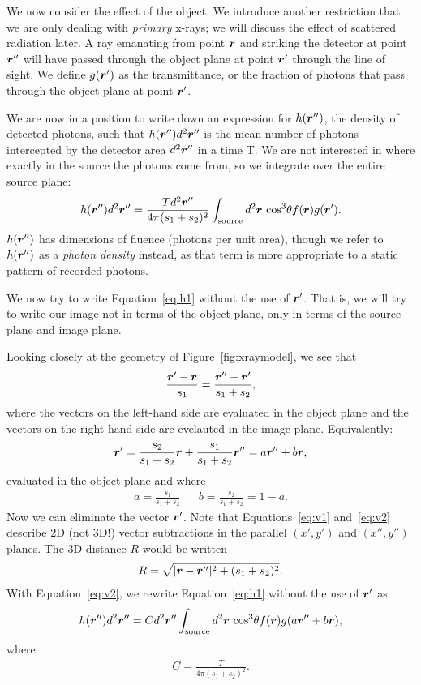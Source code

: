 \documentclass[mphy386-notes.tex]{subfiles}
\begin{document}
We now consider the effect of the object. We introduce another restriction
that we are only dealing with \textit{primary} x-rays; we will discuss the
effect of scattered radiation later. A ray emanating from point $\boldsymbol{r}$ and
striking the detector at point $\boldsymbol{r}''$ will have passed through the object
plane at point $\boldsymbol{r}'$ through the line of sight. We define $g(\boldsymbol{r}')$ as the transmittance, or the
fraction of photons that pass through the object plane at point $\boldsymbol{r}'$.

We are now in a position to write down an expression for $h(\boldsymbol{r}'')$, the
density of detected photons, such that $h(\boldsymbol{r}'')d^2\boldsymbol{r}''$ is the mean
number of photons intercepted by the detector area $d^2\boldsymbol{r}''$ in a time T.
We are not interested in where exactly in the source the photons come from,
so we integrate over the entire source plane:
\begin{align}
  h(\boldsymbol{r}'')d^2\boldsymbol{r}'' = \frac{Td^2\boldsymbol{r}''}{4\pi(s_1 + s_2)^2}\int_{\text{source}}d^2\boldsymbol{r} \text{ cos}^3\theta f(\boldsymbol{r})g(\boldsymbol{r}').
  \label{eq:h1}
\end{align}
$h(\boldsymbol{r}'')$ has dimensions of fluence (photons per unit area), though
we refer to $h(\boldsymbol{r}'')$ as a \textit{photon density} instead, as that
term is more appropriate to a static pattern of recorded photons.

We now try to write Equation~\ref{eq:h1} without the use of $\boldsymbol{r}'$.  That is,
we will try to write our image not in terms of the object plane,  only in terms
of the source plane and image plane.

Looking closely at the geometry of Figure~\ref{fig:xraymodel}, we
see that
\begin{align}
  \frac{\boldsymbol{r}'-\boldsymbol{r}}{s_1} = \frac{\boldsymbol{r}''-\boldsymbol{r}'}{s_1+s_2},
  \label{eq:v1}
\end{align}
where the vectors on the left-hand side are evaluated in the object plane
and the vectors on the right-hand side are evelauted in the image plane.
Equivalently:
\begin{align}
  \boldsymbol{r}' = \frac{s_2}{s_1 + s_2}\boldsymbol{r} + \frac{s_1}{s_1+s_2}\boldsymbol{r}'' = a\boldsymbol{r}'' + b\boldsymbol{r},
  \label{eq:v2}
\end{align}
evaluated in the object plane and where
\begin{align}
  a = \frac{s_1}{s_1+s_2} & & b = \frac{s_2}{s_1 + s_2} = 1 - a.
\end{align}
Now we can eliminate the vector $\boldsymbol{r}'$. Note that Equations~\ref{eq:v1}
and~\ref{eq:v2} describe 2D (not 3D!) vector subtractions in the parallel $(x',y')$
and $(x'',y'')$ planes. The 3D distance $R$ would be written
\begin{align}
  R = \sqrt{|\boldsymbol{r}-\boldsymbol{r}''|^2 + (s_1+s_2)^2}.
\end{align}
With Equation~\ref{eq:v2}, we rewrite Equation~\ref{eq:h1} without the use of $\boldsymbol{r}'$ as
\begin{align}
  h(\boldsymbol{r}'')d^2\boldsymbol{r}'' = Cd^2\boldsymbol{r}''\int_{\text{source}}d^2\boldsymbol{r} \text{ cos}^3\theta f(\boldsymbol{r})g(a\boldsymbol{r}'' + b\boldsymbol{r}),
  \label{eq:h2}
\end{align}
where
\begin{align}
  C = \frac{T}{4\pi(s_1+s_2)^2}.
\end{align}
\end{document}
